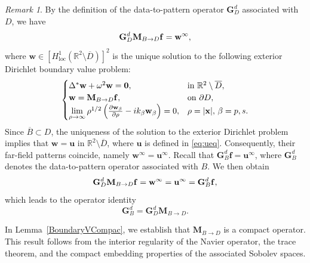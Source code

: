 \documentclass[11pt,reqno,twoside]{amsart}
\theoremstyle{definition}
\theoremstyle{remark}
\newtheorem{rem}{Remark}[section]
\numberwithin{equation}{section}
\begin{document}
\begin{rem}
By the definition of the data-to-pattern operator \(\mathbf{G}_D^d\) associated with \(D\), we have
\begin{equation}\notag
    \mathbf{G}_D^d \mathbf{M}_{B \to  D} \mathbf{f} = \mathbf{w}^{\infty},
\end{equation}
where $\mathbf{w} \in [H^1_{\mathrm{loc}}(\mathbb{R}^2 \setminus \overline{D})]^2$ is the unique solution to the following exterior Dirichlet boundary value problem:
\begin{equation}\notag
    \begin{cases}
        \Delta^* \mathbf{w} + \omega^2 \mathbf{w} = \mathbf{0}, & 	\text{in } \mathbb{R}^2 \setminus \overline{D}, \\
        \mathbf{w} = \mathbf{M}_{B 	\to D} \mathbf{f}, & 	\text{on } \partial D, \\
        \lim\limits_{\rho 	\to \infty} \rho^{1/2} \left( \frac{\partial \mathbf{w}_\beta}{\partial \rho} - i k_\beta \mathbf{w}_\beta \right) = 0, & \rho = |\mathbf{x}|, \, \beta = p, s.
    \end{cases}
\end{equation}
Since $\overline{B} \subset D$, the uniqueness of the solution to the exterior Dirichlet problem implies that $\mathbf{w} = \mathbf{u}$ in $\mathbb{R}^2 \setminus \overline{D}$, where $\mathbf{u}$ is defined in \eqref{eq:ueq}. Consequently, their far-field patterns coincide, namely $\mathbf{w}^{\infty} = \mathbf{u}^{\infty}$. Recall that $\mathbf{G}^d_B \mathbf{f} = \mathbf{u}^{\infty}$, where $\mathbf{G}^d_B$ denotes the data-to-pattern operator associated with \(B\). We then obtain
\begin{equation}\notag
    \mathbf{G}_D^d \mathbf{M}_{B 	\to D} \mathbf{f} = \mathbf{w}^{\infty} = \mathbf{u}^{\infty} = \mathbf{G}_B^d \mathbf{f},
\end{equation}
which leads to the operator identity 
\begin{equation}\label{eq:GM relation}
\mathbf{G}_B^d = \mathbf{G}_D^d \mathbf{M}_{B \to D}.
\end{equation}
\end{rem}


In Lemma~\ref{BoundaryVCompac}, we establish that $\mathbf{M}_{B \to D}$ is a compact operator. This result follows from the interior regularity of the Navier operator, the trace theorem, and the compact embedding properties of the associated Sobolev spaces.
\end{document}
